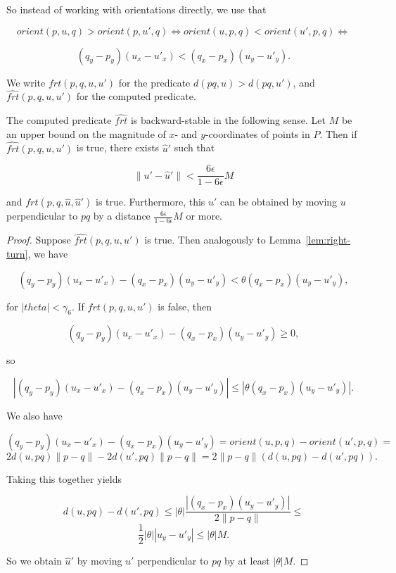 So instead of working with orientations directly, we use that

$$orient(p, u, q) > orient(p, u', q) \iff orient(u, p, q) < orient(u', p, q) 
\iff$$

$$(q_y - p_y) (u_x - u'_x) < (q_x - p_x) (u_y - u'_y).$$

We write $frt(p, q, u, u')$ for the predicate $d(pq, u) > d(pq, u')$,
and $\widehat{frt}(p, q, u, u')$ for the computed predicate.

\begin{lemma}\label{lem:farther}
    The computed predicate $\widehat{frt}$ is backward-stable in the 
    following sense. Let $M$ be an upper bound on the magnitude of 
    $x$- and $y$-coordinates of points in $P$. 
    Then if $\widehat{frt}(p, q, u, u')$ is true, there exists 
    $\hat{u}'$ such that

    $$\lVert u' - \hat{u}' \rVert < \frac{6\epsilon}{1 - 6\epsilon}M$$

    and $frt(p, q, \hat{u}, \hat{u}')$ is true. Furthermore, this 
    $\hat{u}'$ can be obtained by moving $u$ perpendicular to $pq$
    by a distance $\frac{6\epsilon}{1 - 6\epsilon}M$ or more.
\end{lemma}

\begin{proof}
    Suppose $\widehat{frt}(p, q, u, u')$ is true. Then analogously to 
    Lemma~\ref{lem:right-turn}, we have

    $$(q_y - p_y) (u_x - u'_x) - (q_x - p_x) (u_y - u'_y) < 
            \theta(q_x - p_x) (u_y - u'_y),$$

    for $|theta| < \gamma_6$. If $frt(p, q, u, u')$ is false, then

    $$(q_y - p_y) (u_x - u'_x) - (q_x - p_x) (u_y - u'_y) \geq 0,$$

    so 

    $$|(q_y - p_y) (u_x - u'_x) - (q_x - p_x) (u_y - u'_y)| \leq 
        |\theta(q_x - p_x) (u_y - u'_y)|. $$

    We also have 

    $$(q_y - p_y) (u_x - u'_x) - (q_x - p_x) (u_y - u'_y) =
       orient(u, p, q) - orient(u', p, q) = $$
    $$2 d(u, pq) \lVert p - q \rVert - 2 d(u', pq) \lVert p - q \rVert = 
        2 \lVert p - q \rVert (d(u, pq) - d(u', pq)). $$

    Taking this together yields

    $$d(u, pq) - d(u', pq) \leq 
       |\theta|\frac{|(q_x - p_x) (u_y - u'_y)|}{2 \lVert p - q \rVert} \leq$$
    $$\frac{1}{2}|\theta| |u_y - u'_y| \leq |\theta|M.$$

    So we obtain $\hat{u}'$ by moving $u'$ perpendicular to $pq$ by at least
    $|\theta|M$.
\end{proof}

